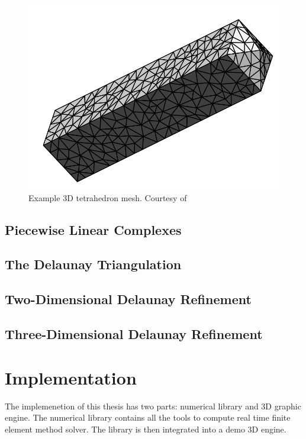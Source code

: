 \documentclass[en]{minipw} %
\begin{document}
\begin{figure}[h!]
\centering
\includegraphics[scale=0.5]{pictures/3dmesh.png}
\caption[Logo MiNI]{Example 3D tetrahedron mesh. Courtesy of~\cite{delaunay_mesh}}
\end{figure}

\section{Piecewise Linear Complexes}

\section{The Delaunay Triangulation}

\section{Two-Dimensional Delaunay Refinement}

\section{Three-Dimensional Delaunay Refinement}

\chapter{Implementation}
The implemenetion of this thesis has two parts: numerical library and 3D graphic engine. The numerical library contains all the tools to compute real time finite element method solver. The library is then integrated into a demo 3D engine.
\end{document}
